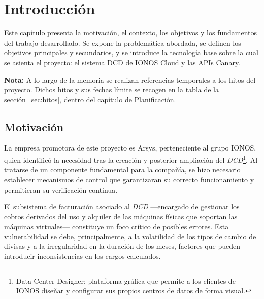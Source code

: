 
\chapter{Introducción}\label{chap:introduccion}

Este capítulo presenta la motivación, el contexto, los objetivos y los fundamentos del trabajo desarrollado. Se expone la problemática abordada, se definen los objetivos principales y secundarios, y se introduce la tecnología base sobre la cual se asienta el proyecto: el sistema DCD de IONOS Cloud y las APIs Canary.

\textbf{Nota:} A lo largo de la memoria se realizan referencias temporales a los hitos del proyecto. Dichos hitos y sus fechas límite se recogen en la tabla de la sección~\ref{sec:hitos}, dentro del capítulo de Planificación.

\section{Motivación}\label{sec:motivacion}
La empresa promotora de este proyecto es Arsys, perteneciente al grupo IONOS, quien identificó
la necesidad tras la creación y posterior ampliación del
\textit{DCD}\footnote{Data Center Designer: plataforma gráfica que permite a los clientes de IONOS diseñar
    y configurar sus propios centros de datos de forma visual.}. Al tratarse de un componente fundamental
para la compañía, se hizo necesario establecer mecanismos de control que garantizaran su correcto
funcionamiento y permitieran su verificación continua.

El subsistema de facturación asociado al \textit{DCD} ---encargado de gestionar los cobros derivados del uso y alquiler de las máquinas físicas que soportan las máquinas virtuales--- constituye un foco crítico de posibles errores. Esta vulnerabilidad se debe, principalmente, a la volatilidad de los tipos de cambio de divisas y a la irregularidad en la duración de los meses, factores que pueden introducir inconsistencias en los cargos calculados.
